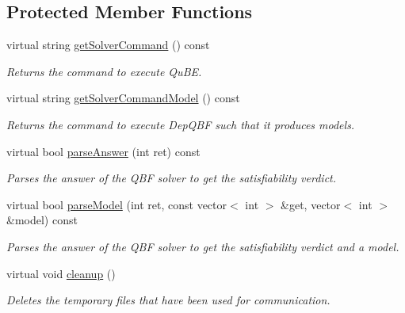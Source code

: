 \subsection*{Protected Member Functions}
\begin{DoxyCompactItemize}
\item 
virtual string \hyperlink{classQuBEExt_a2af26a63952d83a50a4bd3d72bfc572a}{get\-Solver\-Command} () const 
\begin{DoxyCompactList}\small\item\em Returns the command to execute Qu\-B\-E. \end{DoxyCompactList}\item 
virtual string \hyperlink{classQuBEExt_a846ea873ec83e57213f1931d85cb8bd0}{get\-Solver\-Command\-Model} () const 
\begin{DoxyCompactList}\small\item\em Returns the command to execute Dep\-Q\-B\-F such that it produces models. \end{DoxyCompactList}\item 
virtual bool \hyperlink{classExtQBFSolver_a11ddbf3980824453238071e8a036f804}{parse\-Answer} (int ret) const 
\begin{DoxyCompactList}\small\item\em Parses the answer of the Q\-B\-F solver to get the satisfiability verdict. \end{DoxyCompactList}\item 
virtual bool \hyperlink{classExtQBFSolver_afe52ff8faa21fbdd850b73e8f8cf9839}{parse\-Model} (int ret, const vector$<$ int $>$ \&get, vector$<$ int $>$ \&model) const 
\begin{DoxyCompactList}\small\item\em Parses the answer of the Q\-B\-F solver to get the satisfiability verdict and a model. \end{DoxyCompactList}\item 
virtual void \hyperlink{classExtQBFSolver_a3ee48837c5e937e4d3a5b3c2a6b761d3}{cleanup} ()
\begin{DoxyCompactList}\small\item\em Deletes the temporary files that have been used for communication. \end{DoxyCompactList}\end{DoxyCompactItemize}
